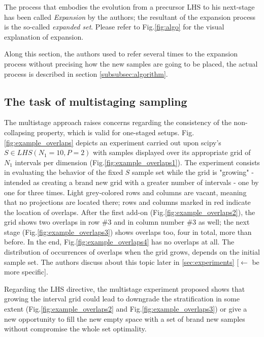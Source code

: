 \documentclass[12pt]{extarticle}
\newcommand{\mfigref}[1]{Fig.\ref{#1}}
\begin{document}
The process that embodies the evolution from a precursor LHS to his next-stage has been called \textit{Expansion} by the authors; the resultant of the expansion process is the so-called \textit{expanded set}. Please refer to \mfigref{fig:algo} for the visual explanation of expansion.

Along this section, the authors used to refer several times to the expansion process without precising how the new samples are going to be placed, the actual process is described in section \cref{subsubsec:algorithm}.

\subsection{The task of multistaging sampling}
\label{subsec:multistage_task}
The multistage approach raises concerns regarding the consistency of the non-collapsing property, which is valid for one-staged setups. \mfigref{fig:example_overlaps} depicts an experiment carried out upon scipy's $S \in LHS(N_1 = 10, P = 2)$ with samples displayed over its appropriate grid of $N_1$ intervals per dimension (\mfigref{fig:example_overlaps1}). The experiment consists in evaluating the behavior of the fixed $S$ sample set while the grid is "growing" - intended as creating a brand new grid with  a greater number of intervals - one by one for three times. 
Light grey-colored rows and columns are vacant, meaning that no projections are located there; rows and columns marked in red indicate the location of overlaps. After the first add-on (\mfigref{fig:example_overlaps2}), the grid shows two overlaps in row \#3 and in column number \#3 as well; the next stage (\mfigref{fig:example_overlaps3}) shows overlaps too, four in total, more than before. In the end, \mfigref{fig:example_overlaps4} has no overlaps at all. The distribution of occurrences of overlaps when the grid grows, depends on the initial sample set. The authors discuss about this topic later in \cref{sec:experiments} [$\longleftarrow$ be more specific].

Regarding the LHS directive, the multistage experiment proposed shows that growing the interval grid could lead to downgrade the stratification in some extent (\mfigref{fig:example_overlaps2} and \mfigref{fig:example_overlaps3}) or give a new opportunity to fill the new empty space with a set of brand new samples without compromise the whole set optimality. 
\end{document}

